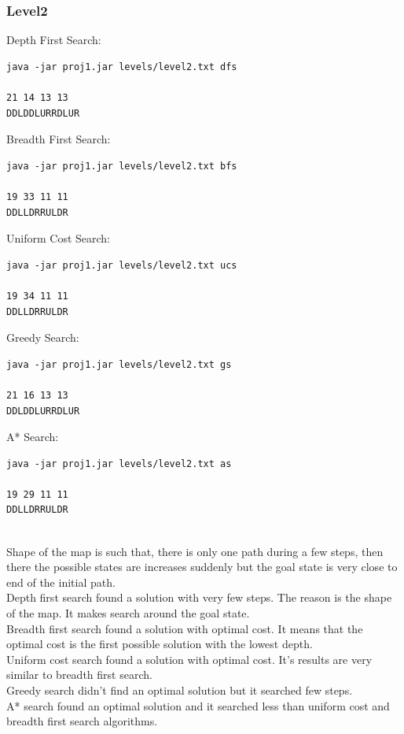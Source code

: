\documentclass[12pt]{article}
\begin{document}
\subsubsection*{Level2}
Depth First Search:
\begin{lstlisting}[style=terminalstyle]
java -jar proj1.jar levels/level2.txt dfs

21 14 13 13
DDLDDLURRDLUR
\end{lstlisting}
Breadth First Search:
\begin{lstlisting}[style=terminalstyle]
java -jar proj1.jar levels/level2.txt bfs

19 33 11 11
DDLLDRRULDR
\end{lstlisting}
Uniform Cost Search:
\begin{lstlisting}[style=terminalstyle]
java -jar proj1.jar levels/level2.txt ucs

19 34 11 11
DDLLDRRULDR
\end{lstlisting}
Greedy Search:
\begin{lstlisting}[style=terminalstyle]
java -jar proj1.jar levels/level2.txt gs

21 16 13 13
DDLDDLURRDLUR
\end{lstlisting}
A* Search:
\begin{lstlisting}[style=terminalstyle]
java -jar proj1.jar levels/level2.txt as

19 29 11 11
DDLLDRRULDR
\end{lstlisting}
\\
Shape of the map is such that, there is only one path during a few steps, then there the possible states are increases suddenly but the goal state is very close to end of the initial path.\\
Depth first search found a solution with very few steps. The reason is the shape of the map. It makes search around the goal state.\\
Breadth first search found a solution with optimal cost. It means that the optimal cost is the first possible solution with the lowest depth.\\
Uniform cost search found a solution with optimal cost. It's results are very similar to breadth first search.\\
Greedy search didn't find an optimal solution but it searched few steps.\\
A* search found an optimal solution and it searched less than uniform cost and breadth first search algorithms.
\end{document}
